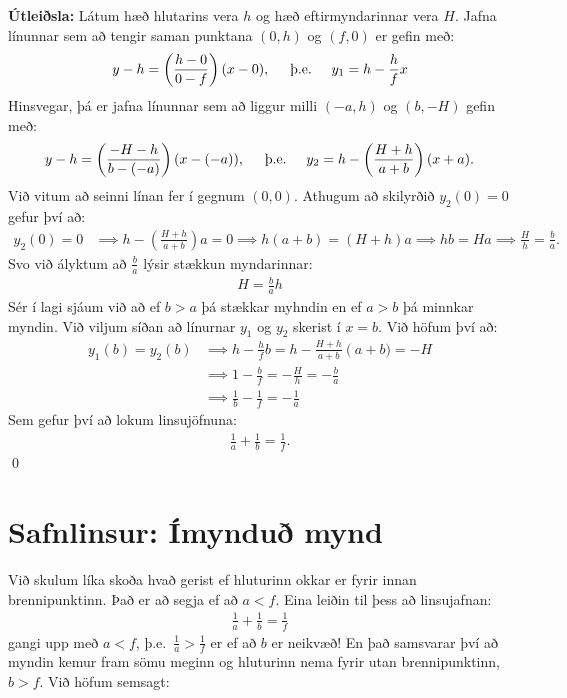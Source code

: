 \ifdefined \wholebook \else\documentclass[oneside]{book}\usepackage{EdlBook}\graphicspath{{figures/}}
\begin{document}
\textbf{Útleiðsla:} Látum hæð hlutarins vera $h$ og hæð eftirmyndarinnar vera $H$. Jafna línunnar sem að tengir saman punktana $(0,h)$ og $(f,0)$ er gefin með:
\begin{align*}
    y - h = \left( \frac{h-0}{0-f} \right)(x-0), \hspace{0.5cm} \text{þ.e.} \hspace{0.5cm} y_1 = h - \frac{h}{f}x
\end{align*}
Hinsvegar, þá er jafna línunnar sem að liggur milli $(-a,h)$ og $(b,-H)$ gefin með:
\begin{align*}
    y-h = \left( \frac{-H-h}{b-(-a)} \right)(x-(-a)), \hspace{0.5cm} \text{þ.e.} \hspace{0.5cm} y_2 = h - \left( \frac{H+h}{a+b} \right)(x+a).
\end{align*}
Við vitum að seinni línan fer í gegnum $(0,0)$. Athugum að skilyrðið $y_2(0) = 0$ gefur því að:
\begin{align*}
    y_2(0) = 0 &\implies h - \left( \frac{H+h}{a+b} \right)a = 0 
    \implies h(a+b) = (H+h)a 
    \implies hb = Ha 
    \implies \frac{H}{h} = \frac{b}{a}.
\end{align*}
Svo við ályktum að $\frac{b}{a}$ lýsir stækkun myndarinnar:
\begin{align*}
    H = \frac{b}{a}h
\end{align*}
Sér í lagi sjáum við að ef $b>a$ þá stækkar myhndin en ef $a>b$ þá minnkar myndin. Við viljum síðan að línurnar $y_1$ og $y_2$ skerist í $x=b$. Við höfum því að:
\begin{align*}
    y_1(b) = y_2(b) &\implies h - \frac{h}{f}b = h- \frac{H+h}{a+b}\left(a+b) = -H \\
    &\implies 1 - \frac{b}{f} = -\frac{H}{h} = -\frac{b}{a} \\
    &\implies \frac{1}{b} - \frac{1}{f} = -\frac{1}{a}
\end{align*}
Sem gefur því að lokum linsujöfnuna:
\begin{align*}
    \frac{1}{a} + \frac{1}{b} = \frac{1}{f}.
\end{align*}
\qed

\section{Safnlinsur: Ímynduð mynd}

Við skulum líka skoða hvað gerist ef hluturinn okkar er fyrir innan brennipunktinn. Það er að segja ef að $a < f$. Eina leiðin til þess að linsujafnan:
\begin{align*}
    \frac{1}{a} + \frac{1}{b} = \frac{1}{f}
\end{align*}
gangi upp með $a < f$, þ.e.~$\frac{1}{a} > \frac{1}{f}$ er ef að $b$ er neikvæð! En það samsvarar því að myndin kemur fram sömu meginn og hluturinn nema fyrir utan brennipunktinn, $b > f$. Við höfum semsagt:
\end{document}
